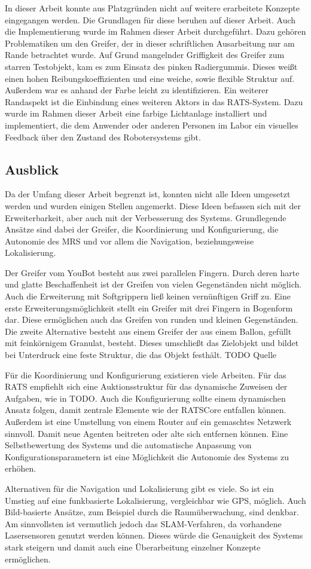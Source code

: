 In dieser Arbeit konnte aus Platzgründen nicht auf weitere erarbeitete Konzepte eingegangen werden. Die Grundlagen für diese beruhen auf dieser Arbeit. Auch die Implementierung wurde im Rahmen dieser Arbeit durchgeführt. Dazu gehören Problematiken um den Greifer, der in dieser schriftlichen Ausarbeitung nur am Rande betrachtet wurde. Auf Grund mangelnder Griffigkeit des Greifer zum starren Testobjekt, kam es zum Einsatz des pinken Radiergummis. Dieses weißt einen hohen Reibungskoeffizienten und eine weiche, sowie flexible Struktur auf. Außerdem war es anhand der Farbe leicht zu identifizieren. Ein weiterer Randaspekt ist die Einbindung eines weiteren Aktors in das RATS-System. Dazu wurde im Rahmen dieser Arbeit eine farbige Lichtanlage installiert und implementiert, die dem Anwender oder anderen Personen im Labor ein visuelles Feedback über den Zustand des Robotersystems gibt.

\subsection{Ausblick}
\label{sec:ausblick}
Da der Umfang dieser Arbeit begrenzt ist, konnten nicht alle Ideen umgesetzt werden und wurden einigen Stellen angemerkt. Diese Ideen befassen sich mit der Erweiterbarkeit, aber auch mit der Verbesserung des Systems. Grundlegende Ansätze sind dabei der Greifer, die Koordinierung und Konfigurierung, die Autonomie des MRS und vor allem die Navigation, beziehungsweise Lokalisierung.

Der Greifer vom YouBot besteht aus zwei parallelen Fingern. Durch deren harte und glatte Beschaffenheit ist der Greifen von vielen Gegenständen nicht möglich. Auch die Erweiterung mit Softgrippern ließ keinen vernünftigen Griff zu. Eine erste Erweiterungsmöglichkeit stellt ein Greifer mit drei Fingern in Bogenform dar. Diese ermöglichen auch das Greifen von runden und kleinen Gegenständen. Die zweite Alternative besteht aus einem Greifer der aus einem Ballon, gefüllt mit feinkörnigem Granulat, besteht. Dieses umschließt das Zielobjekt und bildet bei Unterdruck eine feste Struktur, die das Objekt festhält. TODO Quelle

Für die Koordinierung und Konfigurierung existieren viele Arbeiten. Für das RATS empfiehlt sich eine Auktionsstruktur für das dynamische Zuweisen der Aufgaben, wie in TODO. Auch die Konfigurierung sollte einem dynamischen Ansatz folgen, damit zentrale Elemente wie der RATSCore entfallen können. Außerdem ist eine Umstellung von einem Router auf ein gemaschtes Netzwerk sinnvoll. Damit neue Agenten beitreten oder alte sich entfernen können. Eine Selbstbewertung des Systems und die automatische Anpassung von Konfigurationsparametern ist eine Möglichkeit die Autonomie des Systems zu erhöhen.

Alternativen für die Navigation und Lokalisierung gibt es viele. So ist ein Umstieg auf eine funkbasierte Lokalisierung, vergleichbar wie GPS, möglich. Auch Bild-basierte Ansätze, zum Beispiel durch die Raumüberwachung, sind denkbar. Am sinnvollsten ist vermutlich jedoch das SLAM-Verfahren, da vorhandene Lasersensoren genutzt werden können. Dieses würde die Genauigkeit des Systems stark steigern und damit auch eine Überarbeitung einzelner Konzepte ermöglichen.


